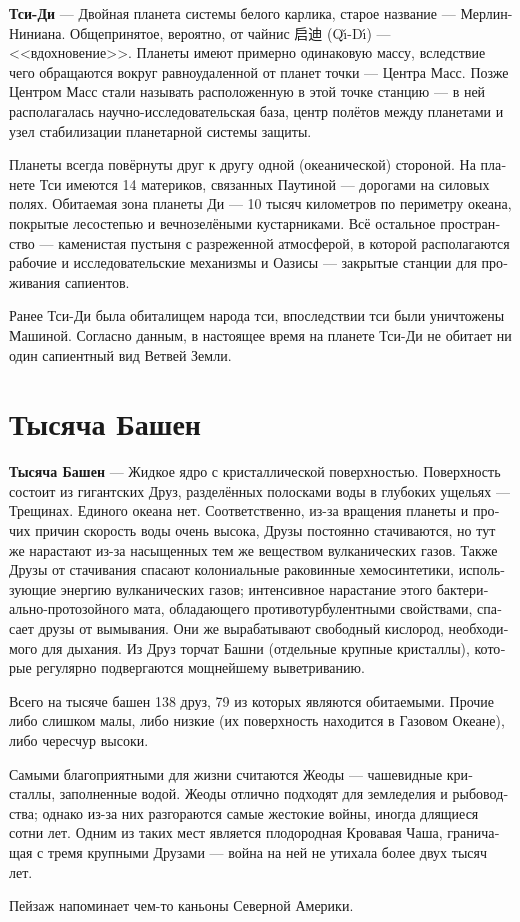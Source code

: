 \documentclass[a4paper,12pt,fleqn]{book}\usepackage{cooltooltips}\usepackage{polyglossia}\setdefaultlanguage[babelshorthands=true]{russian}\setotherlanguage{english}\defaultfontfeatures{Ligatures=TeX,Mapping=tex-text} \usepackage{xcolor}\definecolor{lightgray}{HTML}{bbbbbb}\color{lightgray}\newcommand{\ml}[3]{\textenglish{\textcolor{black}{#3}}}
\newcommand{\theterm}[3]{\textbf{\hypertarget{#1}{#2}} --- #3}
\begin{document}
\theterm{qi-di}
{Тси-Ди}
{Двойная планета системы белого карлика, старое название --- Мерлин-Ниниана.
Общепринятое, вероятно, от чайнис 启迪 (Q\v{\i}-D\'{\i}) --- <<вдохновение>>.
Планеты имеют примерно одинаковую массу, вследствие чего обращаются вокруг равноудаленной от планет точки --- Центра Масс.
Позже Центром Масс стали называть расположенную в этой точке станцию --- в ней располагалась научно-исследовательская база, центр полётов между планетами и узел стабилизации планетарной системы защиты.

Планеты всегда повёрнуты друг к другу одной (океанической) стороной.
На планете Тси имеются 14 материков, связанных Паутиной --- дорогами на силовых полях.
Обитаемая зона планеты Ди --- 10 тысяч километров по периметру океана, покрытые лесостепью и вечнозелёными кустарниками.
Всё остальное пространство --- каменистая пустыня с разреженной атмосферой, в которой располагаются рабочие и исследовательские механизмы и Оазисы --- закрытые станции для проживания сапиентов.

Ранее Тси-Ди была обиталищем народа тси, впоследствии тси были уничтожены Машиной.
Согласно данным, в настоящее время на планете Тси-Ди не обитает ни один сапиентный вид Ветвей Земли.}

\section{Тысяча Башен}

\theterm{thousand-towers}
{Тысяча Башен}
{Жидкое ядро с кристаллической поверхностью.
Поверхность состоит из гигантских Друз, разделённых полосками воды в глубоких ущельях --- Трещинах.
Единого океана нет.
Соответственно, из-за вращения планеты и прочих причин скорость воды очень высока, Друзы постоянно стачиваются, но тут же нарастают из-за насыщенных тем же веществом вулканических газов.
Также Друзы от стачивания спасают колониальные раковинные хемосинтетики, использующие энергию вулканических газов;
интенсивное нарастание этого бактериально-протозойного мата, обладающего противотурбулентными свойствами, спасает друзы от вымывания.
Они же вырабатывают свободный кислород, необходимого для дыхания.
Из Друз торчат Башни (отдельные крупные кристаллы), которые регулярно подвергаются мощнейшему выветриванию.

Всего на тысяче башен 138 друз, 79 из которых являются обитаемыми.
Прочие либо слишком малы, либо низкие (их поверхность находится в Газовом Океане), либо чересчур высоки.

Самыми благоприятными для жизни считаются Жеоды --- чашевидные кристаллы, заполненные водой.
Жеоды отлично подходят для земледелия и рыбоводства;
однако из-за них разгораются самые жестокие войны, иногда длящиеся сотни лет.
Одним из таких мест является плодородная Кровавая Чаша, граничащая с тремя крупными Друзами --- война на ней не утихала более двух тысяч лет.

Пейзаж напоминает чем-то каньоны Северной Америки.}
\end{document}
